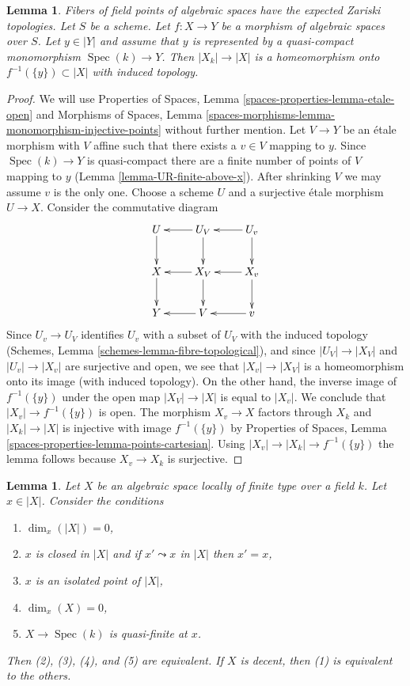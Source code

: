 \documentclass{stacks-project}
\newenvironment{slogan}{\comment}{\endcomment}
\theoremstyle{plain}
\newtheorem{lemma}[subsection]{Lemma}
\theoremstyle{definition}
\theoremstyle{remark}
\numberwithin{equation}{subsection}
\def\Spec{\mathop{\mathrm{Spec}}}
\begin{document}
\begin{lemma}
\label{lemma-topology-fibre}
\begin{slogan}
Fibers of field points of algebraic spaces have the
expected Zariski topologies.
\end{slogan}
Let $S$ be a scheme. Let $f : X \to Y$ be a morphism of algebraic spaces
over $S$.
Let $y \in |Y|$ and assume that $y$ is represented by a quasi-compact
monomorphism $\Spec(k) \to Y$. Then $|X_k| \to |X|$ is a
homeomorphism onto $f^{-1}(\{y\}) \subset |X|$ with induced topology.
\end{lemma}

\begin{proof}
We will use
Properties of Spaces, Lemma \ref{spaces-properties-lemma-etale-open}
and
Morphisms of Spaces, Lemma
\ref{spaces-morphisms-lemma-monomorphism-injective-points}
without further mention.
Let $V \to Y$ be an \'etale morphism with $V$ affine such that there
exists a $v \in V$ mapping to $y$. Since $\Spec(k) \to Y$ is quasi-compact
there are a finite number of points of $V$ mapping to $y$
(Lemma \ref{lemma-UR-finite-above-x}). After shrinking
$V$ we may assume $v$ is the only one. Choose a scheme $U$ and
a surjective \'etale morphism $U \to X$.
Consider the commutative diagram
$$
\xymatrix{
U \ar[d] & U_V \ar[l] \ar[d] & U_v \ar[l] \ar[d] \\
X \ar[d] & X_V \ar[l] \ar[d] & X_v \ar[l] \ar[d] \\
Y & V \ar[l] & v \ar[l]
}
$$
Since $U_v \to U_V$ identifies $U_v$ with a subset of $U_V$ with
the induced topology (Schemes, Lemma \ref{schemes-lemma-fibre-topological}),
and since $|U_V| \to |X_V|$ and $|U_v| \to |X_v|$ are surjective and open,
we see that $|X_v| \to |X_V|$ is a homeomorphism onto its image (with
induced topology).
On the other hand, the inverse image of $f^{-1}(\{y\})$
under the open map $|X_V| \to |X|$ is equal to $|X_v|$.
We conclude that $|X_v| \to f^{-1}(\{y\})$ is open.
The morphism $X_v \to X$ factors through $X_k$
and $|X_k| \to |X|$ is injective with image $f^{-1}(\{y\})$
by Properties of Spaces, Lemma
\ref{spaces-properties-lemma-points-cartesian}. Using
$|X_v| \to |X_k| \to f^{-1}(\{y\})$ the lemma follows because
$X_v \to X_k$ is surjective.
\end{proof}

\begin{lemma}
\label{lemma-conditions-on-point-on-space-over-field}
Let $X$ be an algebraic space locally of finite type over a field $k$.
Let $x \in |X|$. Consider the conditions
\begin{enumerate}
\item $\dim_x(|X|) = 0$,
\item $x$ is closed in $|X|$ and if $x' \leadsto x$  in $|X|$ then $x' = x$,
\item $x$ is an isolated point of $|X|$,
\item $\dim_x(X) = 0$,
\item $X \to \Spec(k)$ is quasi-finite at $x$.
\end{enumerate}
Then (2), (3), (4), and (5) are equivalent.
If $X$ is decent, then (1) is equivalent to the others.
\end{lemma}
\end{document}
